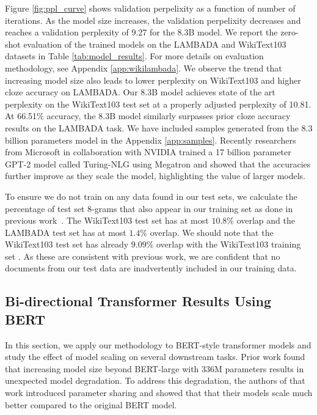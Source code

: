 Figure \ref{fig:ppl_curve} shows validation perpelixity as a function of number of iterations. As the model size increases, the validation perpelixity decreases and reaches  a validation perplexity of 9.27 for the 8.3B model. We report the zero-shot evaluation of the trained models on the LAMBADA and WikiText103 datasets in Table \ref{tab:model_results}. For more details on evaluation methodology, see Appendix \ref{app:wikilambada}. We observe the trend that increasing model size also leads to lower perplexity on WikiText103 and higher cloze accuracy on LAMBADA. Our 8.3B model achieves state of the art perplexity on the WikiText103 test set at a properly adjusted perplexity of 10.81. At 66.51\% accuracy, the 8.3B model similarly surpasses prior cloze accuracy results on the LAMBADA task. We have included samples generated from the 8.3 billion parameters model in the Appendix \ref{app:samples}. Recently researchers from Microsoft in collaboration with NVIDIA trained a 17 billion parameter GPT-2 model called Turing-NLG \cite{TNLG} using Megatron and showed that the accuracies further improve as they scale the model, highlighting the value of larger models. 

To ensure we do not train on any data found in our test sets, we calculate the percentage of test set 8-grams that also appear in our training set as done in previous work~\cite{Radford2019GPT2}. The WikiText103 test set has at most $10.8\%$ overlap and the LAMBADA test set \citep{lambada} has at most $1.4\%$ overlap. We should note that the WikiText103 test set has already $9.09\%$ overlap with the WikiText103 training set \cite{Radford2019GPT2}. As these are consistent with previous work, we are confident that no documents from our test data are inadvertently included in our training data.

\subsection{Bi-directional Transformer Results Using BERT}

In this section, we apply our methodology to BERT-style transformer models and study the effect of model scaling on several downstream tasks. Prior work \cite{ALBERT2019} found that increasing model size beyond BERT-large with 336M parameters results in unexpected model degradation. To address this degradation, the authors of that work \cite{ALBERT2019} introduced parameter sharing and showed that that their models scale much better compared to the original BERT model.

